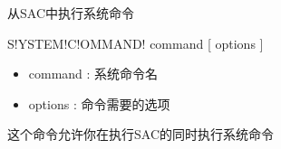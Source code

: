 \label{cmd:systemcommand}

从SAC中执行系统命令

\begin{SACSTX}
S!YSTEM!C!OMMAND! command [ options ]
\end{SACSTX}

\begin{itemize}
\item command : 系统命令名 
\item options : 命令需要的选项 
\end{itemize}

这个命令允许你在执行SAC的同时执行系统命令
